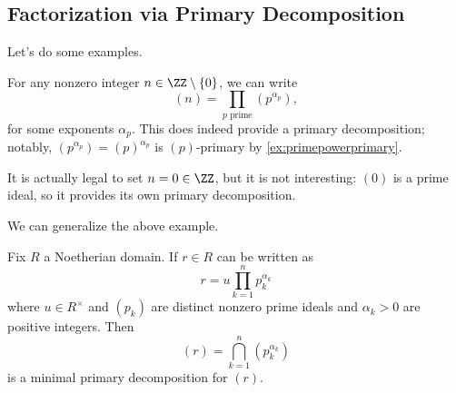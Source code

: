 \documentclass[../notes.tex]{subfiles}
\begin{document}
\subsection{Factorization via Primary Decomposition}
Let's do some examples.
\begin{example}
	For any nonzero integer $n\in\ZZ\setminus\{0\}$, we can write
	\[(n)=\prod_{p\text{ prime}}\left(p^{\alpha_p}\right),\]
	for some exponents $\alpha_p$. This does indeed provide a primary decomposition; notably, $\left(p^{\alpha_p}\right)=(p)^{\alpha_p}$ is $(p)$-primary by \autoref{ex:primepowerprimary}.
\end{example}
\begin{remark}[Nir]
	It is actually legal to set $n=0\in\ZZ$, but it is not interesting: $(0)$ is a prime ideal, so it provides its own primary decomposition.
\end{remark}
We can generalize the above example.
\begin{proposition} \label{prop:primdecompprincipals}
	Fix $R$ a Noetherian domain. If $r\in R$ can be written as
	\[r=u\prod_{k=1}^np_k^{\alpha_k}\]
	where $u\in R^\times$ and $(p_k)$ are distinct nonzero prime ideals and $\alpha_k>0$ are positive integers. Then
	\[(r)=\bigcap_{k=1}^n\left(p_k^{\alpha_k}\right)\]
	is a minimal primary decomposition for $(r)$.
\end{proposition}
\end{document}
